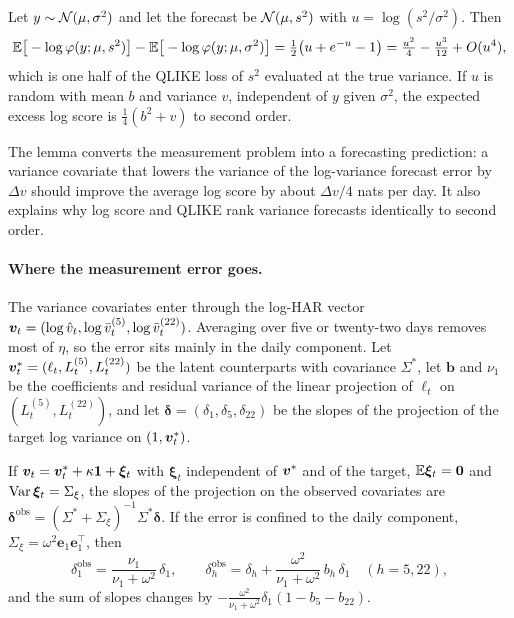 \begin{lemma}\label{lem:logvar-cost}
Let $y\sim\mathcal{N}(\mu,\sigma^2)$ and let the forecast be $\mathcal{N}(\mu,s^2)$ with $u=\log(s^2/\sigma^2)$. Then
\begin{equation}\label{eq:logvar-cost}
  \mathbb{E}\big[-\log\varphi(y;\mu,s^2)\big]-\mathbb{E}\big[-\log\varphi(y;\mu,\sigma^2)\big]=\tfrac12\big(u+e^{-u}-1\big)
  =\tfrac{u^2}{4}-\tfrac{u^3}{12}+O(u^4),
\end{equation}
which is one half of the QLIKE loss of $s^2$ evaluated at the true variance. If $u$ is random with
mean $b$ and variance $v$, independent of $y$ given $\sigma^2$, the expected excess log score is
$\tfrac14(b^2+v)$ to second order.
\end{lemma}

\noindent The lemma converts the measurement problem into a forecasting prediction: a variance
covariate that lowers the variance of the log-variance forecast error by $\Delta v$ should improve the
average log score by about $\Delta v/4$ nats per day. It also explains why log score and QLIKE rank
variance forecasts identically to second order.

\paragraph{Where the measurement error goes.}
The variance covariates enter through the log-HAR vector
$\bm{v}_t=(\log\hat v_t,\log\bar v^{(5)}_t,\log\bar v^{(22)}_t)$. Averaging over five or twenty-two days
removes most of $\eta$, so the error sits mainly in the daily component. Let
$\bm{v}^\ast_t=(\ell_t,L^{(5)}_t,L^{(22)}_t)$ be the latent counterparts with covariance $\Sigma^\ast$,
let $\bm b$ and $\nu_1$ be the coefficients and residual variance of the linear projection of $\ell_t$
on $(L^{(5)}_t,L^{(22)}_t)$, and let $\bm\delta=(\delta_1,\delta_5,\delta_{22})$ be the slopes of the
projection of the target log variance on $(1,\bm{v}^\ast_t)$.

\begin{proposition}\label{prop:eiv}
If $\bm{v}_t=\bm{v}_t^\ast+\kappa\bm1+\bm\xi_t$ with $\bm\xi_t$ independent of $\bm{v}^\ast$ and of the
target, $\mathbb{E}\bm\xi_t=\bm0$ and $\operatorname{Var}\bm\xi_t=\Sigma_\xi$, the slopes of the projection on the observed
covariates are $\bm\delta^{\mathrm{obs}}=(\Sigma^\ast+\Sigma_\xi)^{-1}\Sigma^\ast\bm\delta$. If the error is
confined to the daily component, $\Sigma_\xi=\omega^2\bm e_1\bm e_1^\top$, then
\begin{equation}\label{eq:eiv}
  \delta_1^{\mathrm{obs}}=\frac{\nu_1}{\nu_1+\omega^2}\,\delta_1,\qquad
  \delta_h^{\mathrm{obs}}=\delta_h+\frac{\omega^2}{\nu_1+\omega^2}\,b_h\,\delta_1\quad(h=5,22),
\end{equation}
and the sum of slopes changes by $-\frac{\omega^2}{\nu_1+\omega^2}\delta_1(1-b_5-b_{22})$.
\end{proposition}

